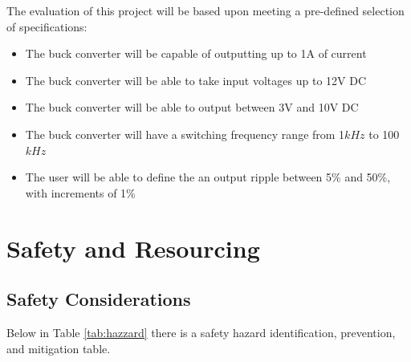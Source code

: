 \documentclass[11pt, a4paper, twoside, openright]{report}
\begin{document}
The evaluation of this project will be based upon meeting a pre-defined selection of specifications:

\begin{itemize}
  \item The buck converter will be capable of outputting up to 1A of current
  \item The buck converter will be able to take input voltages up to 12V DC
  \item The buck converter will be able to output between 3V and 10V DC
  \item The buck converter will have a switching frequency range from 1$kHz$ to 100$kHz$
  \item The user will be able to define the an output ripple between 5\% and 50\%, with increments of 1\%
\end{itemize}

\section{Safety and Resourcing}

\subsection{Safety Considerations}

Below in Table \ref{tab:hazzard} there is a safety hazard identification, prevention, and mitigation table.
\end{document}
